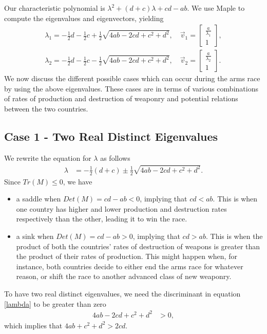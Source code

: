 Our characteristic polynomial is $\lambda^2 + (d+c)\lambda + cd - ab$. We use Maple to compute the eigenvalues and eigenvectors, yielding
	\begin{align}
	\lambda_1 = -\frac{1}{2}d - \frac{1}{2}c + \frac{1}{2}\sqrt{4ab -2cd + c^2 + d^2}, \quad \vec{v}_1 = 
	\begin{bmatrix}
	\frac{a}{\lambda_1}\\
	1
	\end{bmatrix},\\
	\lambda_2 = -\frac{1}{2}d - \frac{1}{2}c - \frac{1}{2}\sqrt{4ab -2cd + c^2 + d^2}, \quad \vec{v}_2 = 
	\begin{bmatrix}
	\frac{a}{\lambda_2}\\
	1
	\end{bmatrix}.
	\end{align}	
We now discuss the different possible cases which can occur during the arms race by using the above eigenvalues. 
These cases are in terms of various combinations of rates of production and destruction of weaponry and potential relations between the two countries.


\subsection{Case 1 - Two Real Distinct Eigenvalues}

We rewrite the equation for $\lambda$ as follows
	\begin{align} \label{lambda}
	\lambda & = -\frac{1}{2}(d + c) \pm \frac{1}{2}\sqrt{4ab -2cd + c^2 + d^2}.
	\end{align}
Since $Tr(M) \le 0$, we have 
	\begin{itemize}
	\item a saddle when $Det(M) = cd-ab < 0$, implying that $cd<ab$. This is when one country has higher and lower production and destruction rates respectively than the other, leading it to win the race.
	
	\item a sink when $Det(M) = cd-ab > 0$, implying that $cd>ab$. This is when the product of both the countries' rates of destruction of weapons is greater than the product of their rates of production. 
	This might happen when, for instance, both countries decide to either end the arms race for whatever reason, or shift the race to another advanced class of new weaponry.
	
	\end{itemize}
To have two real distinct eigenvalues, we need the discriminant in equation \eqref{lambda} to be greater than zero
	\begin{align} \label{discGreaterThanZero}
	4ab -2cd + c^2 + d^2 & > 0,
	\end{align}
which implies that $4ab + c^2 + d^2 > 2cd$. 


